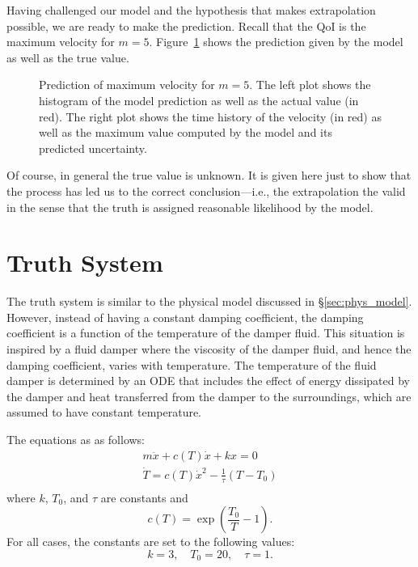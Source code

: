 \documentclass[11pt]{article}
\begin{document}
Having challenged our model and the hypothesis that makes
extrapolation possible, we are ready to make the prediction.  Recall
that the QoI is the maximum velocity for $m=5$.  Figure~\ref{fig:qoi}
shows the prediction given by the model as well as the true value.  
%
\begin{figure}[ht]
\begin{center}
\end{center}
\caption{Prediction of maximum velocity for $m=5$.  The left plot shows the histogram of the model prediction as well as the actual value (in red).  The right plot shows the time history of the velocity (in red) as well as the maximum value computed by the model and its predicted uncertainty.}
\label{fig:qoi}
\end{figure}
% 
Of course, in general the true value is unknown.  It is given here
just to show that the process has led us to the correct
conclusion---i.e., the extrapolation the valid in the sense that the
truth is assigned reasonable likelihood by the model.




\appendix
\section{Truth System}
\label{app:truth}
The truth system is similar to the physical model discussed in
\S\ref{sec:phys_model}.  However, instead of having a constant damping
coefficient, the damping coefficient is a function of the temperature
of the damper fluid.  This situation is inspired by a fluid damper where the
viscosity of the damper fluid, and hence the damping coefficient,
varies with temperature.  The temperature of the fluid damper is
determined by an ODE that includes the effect of energy dissipated by
the damper and heat transferred from the damper to the surroundings,
which are assumed to have constant temperature.

The equations as as follows:
%
\begin{gather*}
m\ddot{x} + c(T) \dot{x} + kx = 0 \\
\dot{T} = c(T) \dot{x}^2 - \frac{1}{\tau}\left(T - T_0\right) \\
\end{gather*}
%
where $k$, $T_0$, and $\tau$ are constants and
%
\begin{equation*}
c(T) = \exp \left( \frac{T_0}{T} - 1 \right).
\end{equation*}
%
For all cases, the constants are set to the following values:
%
\begin{equation*}
k = 3, \quad T_0 = 20, \quad \tau = 1.
\end{equation*}
%
\end{document}
